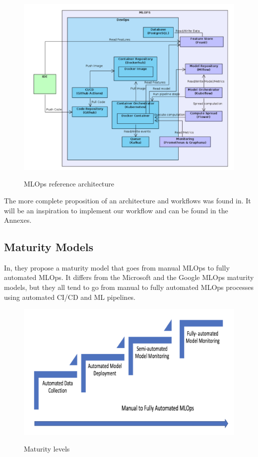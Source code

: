 \begin{figure}[!htbp]
    \caption{MLOps reference architecture\cite{10855428}}
    \centering
    \includegraphics[scale=0.5]{images/infrastructure}
    \label{fig:infra}
\end{figure}

The more complete proposition of an architecture and workflows was found in\cite{Kreuzberger2022MachineLO}.
It will be an inspiration to implement our workflow and can be found in the Annexes.

\subsection{Maturity Models}\label{subsec:matutiry-models}
In\cite{mlops-maturity-model}, they propose a maturity model that goes from manual MLOps to fully automated MLOps.
It differs from the Microsoft and the Google MLOps maturity models,
but they all tend to go from manual to fully automated MLOps processes using automated CI/CD and
ML pipelines.\cite{mlops-definition-tools-and-challenge}

\begin{figure}[!htbp]
    \caption{Maturity levels \cite{mlops-maturity-model}}
    \centering
    \includegraphics[scale=0.5]{images/maturity-levels}
    \label{fig:maturity}
\end{figure}


